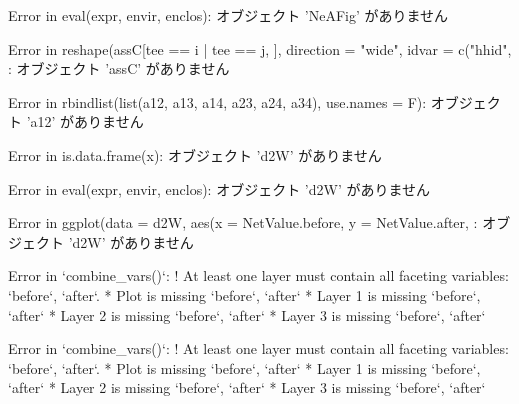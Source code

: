 \begin{Schunk}
\begin{Soutput}
Error in eval(expr, envir, enclos):  オブジェクト 'NeAFig' がありません 
\end{Soutput}
\begin{Soutput}
Error in reshape(assC[tee == i | tee == j, ], direction = "wide", idvar = c("hhid", :  オブジェクト 'assC' がありません 
\end{Soutput}
\begin{Soutput}
Error in rbindlist(list(a12, a13, a14, a23, a24, a34), use.names = F):  オブジェクト 'a12' がありません 
\end{Soutput}
\begin{Soutput}
Error in is.data.frame(x):  オブジェクト 'd2W' がありません 
\end{Soutput}
\begin{Soutput}
Error in eval(expr, envir, enclos):  オブジェクト 'd2W' がありません 
\end{Soutput}
\begin{Soutput}
Error in ggplot(data = d2W, aes(x = NetValue.before, y = NetValue.after, :  オブジェクト 'd2W' がありません 
\end{Soutput}
\begin{Soutput}
Error in `combine_vars()`:
! At least one layer must contain all faceting variables: `before`, `after`.
* Plot is missing `before`, `after`
* Layer 1 is missing `before`, `after`
* Layer 2 is missing `before`, `after`
* Layer 3 is missing `before`, `after`
\end{Soutput}
\begin{Soutput}
Error in `combine_vars()`:
! At least one layer must contain all faceting variables: `before`, `after`.
* Plot is missing `before`, `after`
* Layer 1 is missing `before`, `after`
* Layer 2 is missing `before`, `after`
* Layer 3 is missing `before`, `after`
\end{Soutput}
\end{Schunk}





